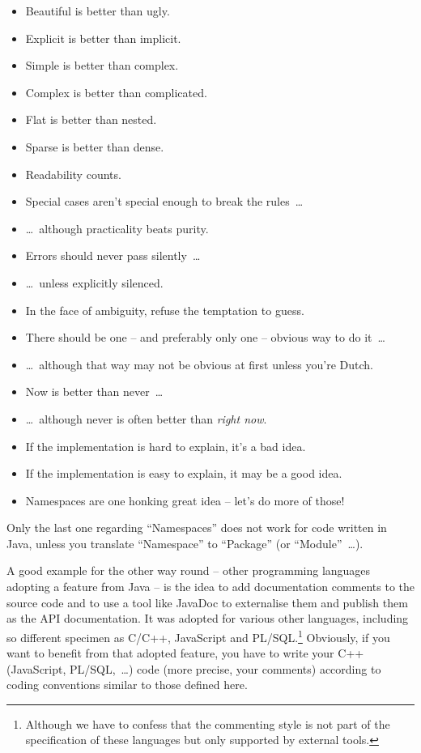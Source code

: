 \documentclass[11pt,a4paper, titlepage, parskip=half, headsepline, footsepline, cleardoublepage=current, headheight=1cm]{scrbook}
\begin{document}
\begin{itemize}[nosep]
	\item Beautiful is better than ugly.
	\item Explicit is better than implicit.
	\item Simple is better than complex.
	\item Complex is better than complicated.
	\item Flat is better than nested.
	\item Sparse is better than dense.
	\item Readability counts.
	\item Special cases aren't special enough to break the rules~…
	\item …~although practicality beats purity.
	\item Errors should never pass silently~…
	\item …~unless explicitly silenced.
	\item In the face of ambiguity, refuse the temptation to guess.
	\item There should be one – and preferably only one – obvious way to do it~…
	\item …~although that way may not be obvious at first unless you're Dutch.
	\item Now is better than never~…
	\item …~although never is often better than \textit{right now}.
	\item If the implementation is hard to explain, it's a bad idea.
	\item If the implementation is easy to explain, it may be a good idea.
	\item Namespaces are one honking great idea – let's do more of those!
\end{itemize}

Only the last one regarding “Namespaces” does not work for code written in Java, unless you translate “Namespace” to “Package” (or “Module”~…).

A good example for the other way round – other programming languages adopting a feature from Java – is the idea to add documentation comments to the source code and to use a tool like JavaDoc to externalise them and publish them as the API documentation. It was adopted for various other languages, including so different specimen as C/C++, JavaScript and PL/SQL.\footnote{Although we have to confess that the commenting style is not part of the specification of these languages but only supported by external tools.} Obviously, if you want to benefit from that adopted feature, you have to write your C++ (JavaScript, PL/SQL,~…) code (more precise, your comments) according to coding conventions similar to those defined here.
\end{document}
